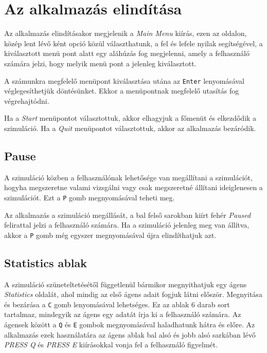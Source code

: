 
\section{Az alkalmazás elindítása}

Az alkalmazás elindításakor megjelenik a \textit{Main Menu} kiírás, ezen az oldalon, közép lent lévő ként opció közül választhatunk,
a fel és lefele nyilak segítségével, a kiválasztott menü pont alatt egy aláhúzás fog megjelenni,
amely a felhasználó számára jelzi, hogy melyik menü pont a jelenleg kiválasztott.

A számunkra megfelelő menüpont kiválasztása utána az \texttt{Enter} lenyomásával véglegesíthetjük döntésünket.
Ekkor a menüpontnak megfelelő utasítás fog végrehajtódni.

Ha a \textit{Start} menüpontot választottuk, akkor elhagyjuk a főmenüt és elkezdődik a szimuláció.
Ha a \textit{Quit} menüpontot választottuk, akkor az alkalmazás bezáródik.


\subsection{Pause}
A szimuláció közben a felhasználónak lehetősége van megállítani a szimulációt, hogyha megszeretne valami vizsgálni vagy csak
megszeretné állítani ideiglenesen a szimulációt. Ezt a \texttt{P} gomb megnyomásával teheti meg.

Az alkalmazás a szimuláció megállását, a bal felső sarokban kiírt fehér \textit{Paused} felirattal jelzi a felhasználó számára.
Ha a szimuláció jelenleg meg van állítva, akkor a \texttt{P} gomb még egyszer megnyomásával újra elindíthatjuk azt.

\subsection{Statistics ablak}
A szimuláció szüneteltetésétől függetlenül bármikor megnyithatjuk egy ágens \textit{Statistics} oldalát, ahol mindig az első ágens adait fogjuk látni először.
Megnyitása és bezárása a \texttt{C} gomb lenyomásával lehetséges.
Ez az ablak 6 darab sort tartalmaz, mindegyik az ágens egy adatát írja ki a felhasználó számára.
Az ágensek között a \texttt{Q} és \texttt{E} gombok megnyomásával haladhatunk hátra és előre. Az alkalmazás ezek használatára az ágens ablak bal alsó és jobb alsó
sarkában lévő \textit{PRESS Q} és \textit{PRESS E} kiírásokkal vonja fel a felhasználó figyelmét.

